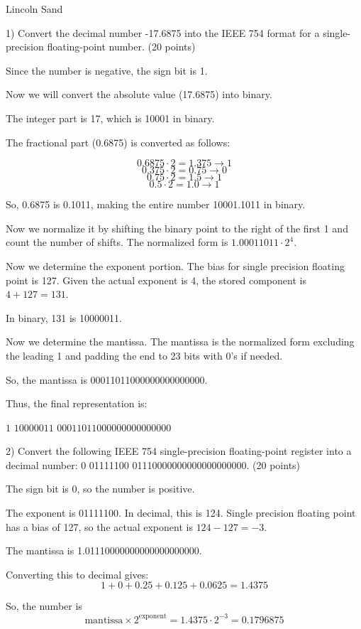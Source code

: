 \documentclass{article}
\begin{document}
\Large{Lincoln Sand}


1) Convert the decimal number -17.6875 into the IEEE 754 format for a single-precision floating-point number. (20 points)

Since the number is negative, the sign bit is 1.

Now we will convert the absolute value (17.6875) into binary.

The integer part is 17, which is 10001 in binary.

The fractional part (0.6875) is converted as follows:

\[0.6875 \cdot 2 = 1.375 \to 1\]
\[0.375 \cdot 2 = 0.75 \to 0\]
\[0.75 \cdot 2 = 1.5 \to 1\]
\[0.5 \cdot 2 = 1.0 \to 1\]

So, 0.6875 is 0.1011, making the entire number 10001.1011 in binary.

Now we normalize it by shifting the binary point to the right of the first 1 and count the number
of shifts. The normalized form is $1.00011011 \cdot 2^4$.

Now we determine the exponent portion. The bias for single precision floating point
is 127. Given the actual exponent is 4, the stored component is $4 + 127 = 131$.

In binary, 131 is 10000011.

Now we determine the mantissa. The mantissa is the normalized form excluding the
leading 1 and padding the end to 23 bits with 0's if needed.

So, the mantissa is 00011011000000000000000.

Thus, the final representation is:

$1$ $10000011$ $00011011000000000000000$

\newpage

2) Convert the following IEEE 754 single-precision floating-point register into a decimal number: 0 01111100 01110000000000000000000. (20 points) 

The sign bit is 0, so the number is positive.

The exponent is 01111100. In decimal, this is 124.
Single precision floating point has a bias of 127,
so the actual exponent is $124 - 127 = -3$.

The mantissa is 1.01110000000000000000000.

Converting this to decimal gives:
\[1 + 0 + 0.25 + 0.125 + 0.0625 = 1.4375\]

So, the number is
\[\text{mantissa} \times 2^{\text{exponent}} = 1.4375 \cdot 2^{-3} = 0.1796875\]
\end{document}
